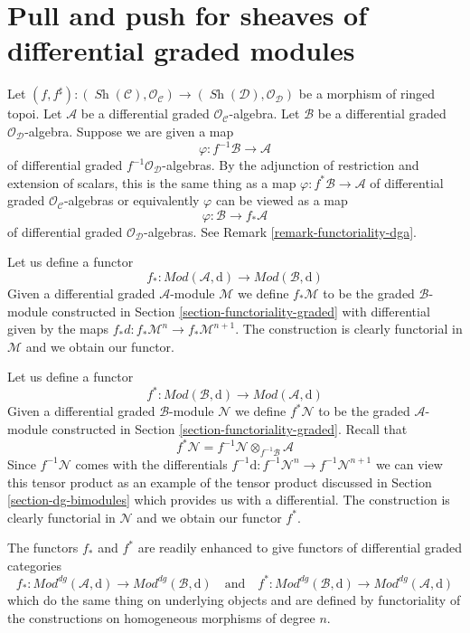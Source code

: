 \documentclass{stacks-project}
\theoremstyle{plain}
\theoremstyle{definition}
\theoremstyle{remark}
\numberwithin{equation}{subsection}
\def\Sh{\mathop{\mathit{Sh}}\nolimits}
\begin{document}
\section{Pull and push for sheaves of differential graded modules}
\label{section-functoriality-dg}

\noindent
Let $(f, f^\sharp) : (\Sh(\mathcal{C}), \mathcal{O}_\mathcal{C})
\to (\Sh(\mathcal{D}), \mathcal{O}_\mathcal{D})$
be a morphism of ringed topoi. Let $\mathcal{A}$ be a differential
graded $\mathcal{O}_\mathcal{C}$-algebra. Let $\mathcal{B}$ be a
differential graded $\mathcal{O}_\mathcal{D}$-algebra.
Suppose we are given a map
$$
\varphi : f^{-1}\mathcal{B} \to \mathcal{A}
$$
of differential graded $f^{-1}\mathcal{O}_\mathcal{D}$-algebras.
By the adjunction of restriction and extension of scalars, this
is the same thing as a map $\varphi : f^*\mathcal{B} \to \mathcal{A}$
of differential graded $\mathcal{O}_\mathcal{C}$-algebras or equivalently
$\varphi$ can be viewed as a map
$$
\varphi : \mathcal{B} \to f_*\mathcal{A}
$$
of differential graded $\mathcal{O}_\mathcal{D}$-algebras.
See Remark \ref{remark-functoriality-dga}.

\medskip\noindent
Let us define a functor
$$
f_* :
\textit{Mod}(\mathcal{A}, \text{d})
\longrightarrow
\textit{Mod}(\mathcal{B}, \text{d})
$$
Given a differential graded $\mathcal{A}$-module $\mathcal{M}$ we define
$f_*\mathcal{M}$ to be the graded $\mathcal{B}$-module constructed
in Section \ref{section-functoriality-graded} with differential
given by the maps $f_*d : f_*\mathcal{M}^n \to f_*\mathcal{M}^{n + 1}$.
The construction is clearly functorial in
$\mathcal{M}$ and we obtain our functor.

\medskip\noindent
Let us define a functor
$$
f^* :
\textit{Mod}(\mathcal{B}, \text{d})
\longrightarrow
\textit{Mod}(\mathcal{A}, \text{d})
$$
Given a differential graded $\mathcal{B}$-module $\mathcal{N}$
we define $f^*\mathcal{N}$ to be the graded $\mathcal{A}$-module
constructed in Section \ref{section-functoriality-graded}. Recall
that
$$
f^*\mathcal{N} = f^{-1}\mathcal{N} \otimes_{f^{-1}\mathcal{B}} \mathcal{A}
$$
Since $f^{-1}\mathcal{N}$ comes with the differentials
$f^{-1}\text{d} : f^{-1}\mathcal{N}^n \to f^{-1}\mathcal{N}^{n + 1}$
we can view this tensor product as an example of the
tensor product discussed in Section \ref{section-dg-bimodules}
which provides us with a differential.
The construction is clearly functorial in
$\mathcal{N}$ and we obtain our functor $f^*$.

\medskip\noindent
The functors $f_*$ and $f^*$ are readily enhanced to give
functors of differential graded categories
$$
f_* :
\textit{Mod}^{dg}(\mathcal{A}, \text{d})
\longrightarrow
\textit{Mod}^{dg}(\mathcal{B}, \text{d})
\quad\text{and}\quad
f^* :
\textit{Mod}^{dg}(\mathcal{B}, \text{d})
\longrightarrow
\textit{Mod}^{dg}(\mathcal{A}, \text{d})
$$
which do the same thing on underlying objects and are defined
by functoriality of the constructions on homogeneous morphisms
of degree $n$.
\end{document}

